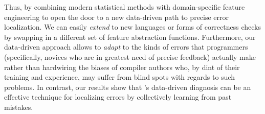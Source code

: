 Thus, by combining modern statistical methods
with domain-specific feature engineering
to open the door to a new data-driven
path to precise error localization.
%
We can easily \emph{extend} \toolname to
new languages or forms of correctness
checks by swapping in a different
set of feature abstraction functions.
%
Furthermore, our data-driven approach
allows \toolname to \emph{adapt} to
the kinds of errors that programmers
(specifically, novices who are in greatest
need of precise feedback) actually make
rather than hardwiring the biases of
compiler authors who, by dint of their
training and experience, may suffer from
blind spots with regards to such problems.
%
In contrast, our results show that \toolname's
data-driven diagnosis can be an effective
technique for localizing errors by collectively
learning from past mistakes.

